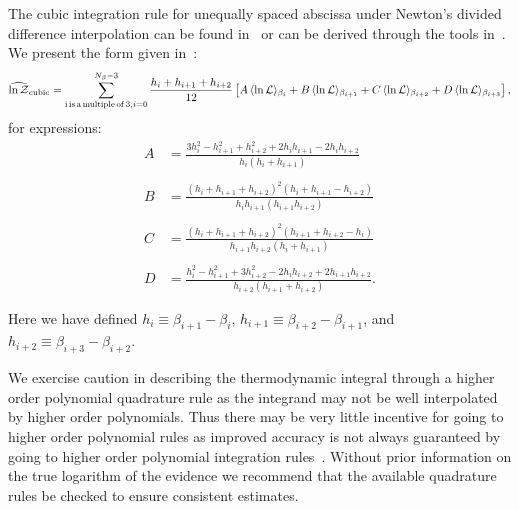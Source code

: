 The cubic integration rule for unequally spaced abscissa under Newton's divided difference interpolation can be found in~\cite{brun1953generalization,selmer1958numerical,chambers1989estimating} or can be derived through the tools in~\cite{abramowitz1965handbook}. We present the form given in~\cite{chambers1989estimating}:
\begin{equation}
    \widehat{\mathrm{ln} \, \mathcal{Z}}_{\mathrm{cubic}} = \sum_{\mathrm{i\, is\, a \, multiple \, of \, 3}, \\ i=0}^{N_\beta-3} \frac{h_i + h_{i+1} + h_{i+2}}{12} \left [A \, \langle \mathrm{ln} \, \mathcal{L} \rangle_{\beta_{i}} + B \, \langle \mathrm{ln} \, \mathcal{L} \rangle_{\beta_{i+1}} + C \, \langle \mathrm{ln} \, \mathcal{L} \rangle_{\beta_{i+2}} + D \, \langle \mathrm{ln} \, \mathcal{L} \rangle_{\beta_{i+3}}\right ],
\end{equation}
for expressions:
\begin{equation}
\begin{array}{llll}
     A &= \frac{3h_i^2 -h_{i+1}^2 +h_{i+2}^2 +2 h_i h_{i+1} - 2h_i h_{i+2}}{h_i (h_i + h_{i+1})} \\ \\
     B &= \frac{(h_i + h_{i+1} + h_{i+2})^2 (h_i + h_{i+1} - h_{i+2})}{h_{i} h_{i+1} (h_{i+1} h_{i+2})} \\ \\
     C &= \frac{(h_i + h_{i+1} + h_{i+2})^2 (h_{i+1} + h_{i+2} - h_i)}{h_{i+1} h_{i+2} (h_i + h_{i+1})} \\ \\
     D &= \frac{h_i^2 - h_{i+1}^2 +3 h_{i+2}^2 - 2h_i h_{i+2} + 2 h_{i+1} h_{i+2}}{h_{i+2}(h_{i+1} + h_{i+2})}.\\ \\
\end{array}
\end{equation}
Here we have defined $h_i \equiv \beta_{i+1} - \beta_{i}$, $h_{i+1} \equiv \beta_{i+2} - \beta_{i+1}$, and $h_{i+2} \equiv \beta_{i+3} - \beta_{i+2}$.

We exercise caution in describing the thermodynamic integral through a higher order polynomial quadrature rule as the integrand may not be well interpolated by higher order polynomials. Thus there may be very little incentive for going to higher order polynomial rules as improved accuracy is not always guaranteed by going to higher order polynomial integration rules~\citep{epperson1987runge}. Without prior information on the true logarithm of the evidence we recommend that the available quadrature rules be checked to ensure consistent estimates.

